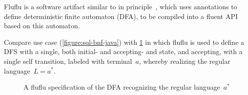 Fluflu is a software artifact similar
to in principle~\Fajita, which uses \Java annotations to define deterministic finite
automaton (DFA), to be compiled into a fluent API based on this automaton. 

Compare \Fajita use case (\cref{figure:sql-bnf-java}) with \cref{figure:fluflu} in
which fluflu is used to define a DFS with a single, both initial- and
accepting- and  state, and accepting, with a single self transition, labeled
with terminal~$a$, whereby realizing the regular language~$L=a^*$.

\begin{figure}[H]
  \caption{\label{figure:fluflu}
    A fluflu specification of the DFA recognizing the regular language~$a^*$}
\end{figure}

